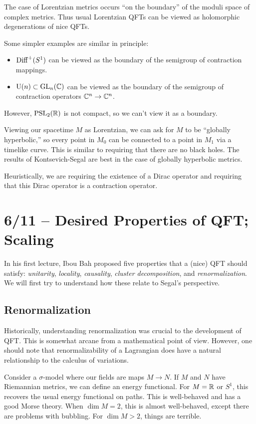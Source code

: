 The case of Lorentzian metrics occurs ``on the boundary'' of the moduli space of complex metrics.
Thus usual Lorentzian QFTs can be viewed as holomorphic degenerations of nice QFTs.

Some simpler examples are similar in principle:
\begin{itemize}
	\item $\operatorname{Diff}^+(S^1)$ can be viewed as the boundary of the semigroup of contraction mappings.
	\item $\mathrm{U}(n) \subset \mathrm{GL}_n(\mathbb{C})$ can be viewed as the boundary of the semigroup of contraction operators $\mathbb{C}^n \to \mathbb{C}^n$.
\end{itemize}

However, $\mathrm{PSL}_2(\mathbb{R})$ is not compact, so we can't view it as a boundary.

Viewing our spacetime $M$ as Lorentzian, we can ask for $M$ to be ``globally hyperbolic,'' so every point in $M_0$ can be connected to a point in $M_1$ via a timelike curve.
This is similar to requiring that there are no black holes.
The results of Kontsevich-Segal are best in the case of globally hyperbolic metrics.

Heuristically, we are requiring the existence of a Dirac operator and requiring that this Dirac operator is a contraction operator.

\section{6/11 -- Desired Properties of QFT; Scaling}

In his first lecture, Ibou Bah proposed five properties that a (nice) QFT should satisfy: \emph{unitarity}, \emph{locality}, \emph{causality}, \emph{cluster decomposition}, and \emph{renormalization}.
We will first try to understand how these relate to Segal's perspective.

\subsection{Renormalization}

Historically, understanding renormalization was crucial to the development of QFT.
This is somewhat arcane from a mathematical point of view.
However, one should note that renormalizability of a Lagrangian does have a natural relationship to the calculus of variations.

Consider a $\sigma$-model where our fields are maps $M \to N$.
If $M$ and $N$ have Riemannian metrics, we can define an energy functional.
For $M = \mathbb{R}$ or $S^1$, this recovers the usual energy functional on paths.
This is well-behaved and has a good Morse theory.
When $\dim M = 2$, this is almost well-behaved, except there are problems with bubbling.
For $\dim M > 2$, things are terrible.

